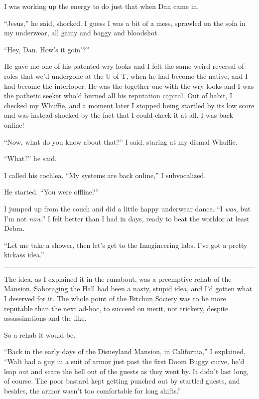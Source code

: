 I was working up the energy to do just that when Dan came in.

“Jesus,” he said, shocked. I guess I was a bit of a mess, sprawled
on the sofa in my underwear, all gamy and baggy and bloodshot.

“Hey, Dan. How's it goin'?”

He gave me one of his patented wry looks and I felt the same weird
reversal of roles that we'd undergone at the U of T, when he had
become the native, and I had become the interloper. He was the
together one with the wry looks and I was the pathetic seeker who'd
burned all his reputation capital. Out of habit, I checked my
Whuffie, and a moment later I stopped being startled by its low
score and was instead shocked by the fact that I could check it at
all. I was back online!

“Now, what do you know about that?” I said, staring at my dismal
Whuffie.

“What?” he said.

I called his cochlea. “My systems are back online,” I
subvocalized.

He started. “You were offline?”

I jumped up from the couch and did a little happy underwear dance.
“I \emph{was}, but I'm not \emph{now}.” I felt better than I had in
days, ready to beat the world{\dash}or at least Debra.

“Let me take a shower, then let's get to the Imagineering labs.
I've got a pretty kickass idea.”

\begin{center}\rule{3in}{0.4pt}\end{center}

The idea, as I explained it in the runabout, was a preemptive rehab
of the Mansion. Sabotaging the Hall had been a nasty, stupid idea,
and I'd gotten what I deserved for it. The whole point of the
Bitchun Society was to be more reputable than the next ad-hoc, to
succeed on merit, not trickery, despite assassinations and the
like.

So a rehab it would be.

“Back in the early days of the Disneyland Mansion, in California,”
I explained, “Walt had a guy in a suit of armor just past the first
Doom Buggy curve, he'd leap out and scare the hell out of the
guests as they went by. It didn't last long, of course. The poor
bastard kept getting punched out by startled guests, and besides,
the armor wasn't too comfortable for long shifts.”

